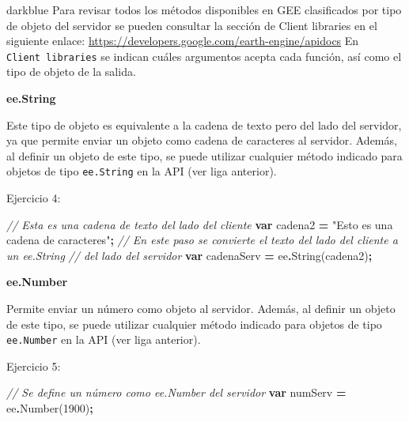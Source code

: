 \documentclass[
  12pt,
  letterpaper,
  twoside]{book}
\newenvironment{Shaded}{\begin{snugshade}}{\end{snugshade}}
\newcommand{\CommentTok}[1]{\textcolor[rgb]{0.56,0.35,0.01}{\textit{#1}}}
\newcommand{\DecValTok}[1]{\textcolor[rgb]{0.00,0.00,0.81}{#1}}
\newcommand{\FunctionTok}[1]{\textcolor[rgb]{0.00,0.00,0.00}{#1}}
\newcommand{\KeywordTok}[1]{\textcolor[rgb]{0.13,0.29,0.53}{\textbf{#1}}}
\newcommand{\NormalTok}[1]{#1}
\newcommand{\OperatorTok}[1]{\textcolor[rgb]{0.81,0.36,0.00}{\textbf{#1}}}
\newcommand{\StringTok}[1]{\textcolor[rgb]{0.31,0.60,0.02}{#1}}
\begin{document}
\begin{bluebox2}

\begin{awesomeblock}{5pt}{\faLightbulb}{darkblue}
Para revisar todos los métodos disponibles en GEE clasificados por tipo de objeto del servidor se pueden consultar la sección de Client libraries en el siguiente enlace: \url{https://developers.google.com/earth-engine/apidocs}
En \texttt{Client\ libraries} se indican cuáles argumentos acepta cada función, así como el tipo de objeto de la salida.

\end{awesomeblock}

\end{bluebox2}

\textbf{ee.String}

Este tipo de objeto es equivalente a la cadena de texto pero del lado del servidor, ya que permite enviar un objeto como cadena de caracteres al servidor. Además, al definir un objeto de este tipo, se puede utilizar cualquier método indicado para objetos de tipo \texttt{ee.String} en la API (ver liga anterior).

Ejercicio 4:

\begin{Shaded}
\begin{Highlighting}[]
\CommentTok{// Esta es una cadena de texto del lado del cliente}
\KeywordTok{var}\NormalTok{ cadena2 }\OperatorTok{=} \StringTok{"Esto es una cadena de caracteres"}\OperatorTok{;}
\CommentTok{// En este paso se convierte el texto del lado del cliente a un ee.String}
\CommentTok{// del lado del servidor}
\KeywordTok{var}\NormalTok{ cadenaServ }\OperatorTok{=}\NormalTok{ ee}\OperatorTok{.}\FunctionTok{String}\NormalTok{(cadena2)}\OperatorTok{;}                         
\end{Highlighting}
\end{Shaded}

\textbf{ee.Number}

Permite enviar un número como objeto al servidor. Además, al definir un objeto de este tipo, se puede utilizar cualquier método indicado para objetos de tipo \texttt{ee.Number} en la API (ver liga anterior).

Ejercicio 5:

\begin{Shaded}
\begin{Highlighting}[]
\CommentTok{// Se define un número como \textasciigrave{}ee.Number\textasciigrave{} del servidor}
\KeywordTok{var}\NormalTok{ numServ }\OperatorTok{=}\NormalTok{ ee}\OperatorTok{.}\FunctionTok{Number}\NormalTok{(}\DecValTok{1900}\NormalTok{)}\OperatorTok{;}                              
\end{Highlighting}
\end{Shaded}
\end{document}
